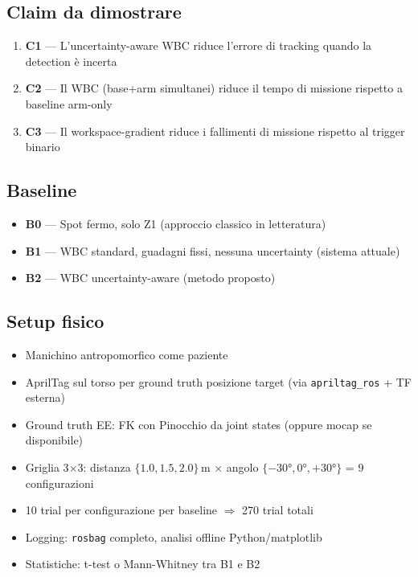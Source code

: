 \documentclass[a4paper,11pt]{article}
\begin{document}
\subsection*{Claim da dimostrare}
\begin{enumerate}
  \item \textbf{C1} --- L'uncertainty-aware WBC riduce l'errore di tracking quando
        la detection è incerta
  \item \textbf{C2} --- Il WBC (base+arm simultanei) riduce il tempo di missione
        rispetto a baseline arm-only
  \item \textbf{C3} --- Il workspace-gradient riduce i fallimenti di missione
        rispetto al trigger binario
\end{enumerate}

\subsection*{Baseline}
\begin{itemize}
  \item \textbf{B0} --- Spot fermo, solo Z1 (approccio classico in letteratura)
  \item \textbf{B1} --- WBC standard, guadagni fissi, nessuna uncertainty
        (sistema attuale)
  \item \textbf{B2} --- WBC uncertainty-aware (metodo proposto)
\end{itemize}

\subsection*{Setup fisico}
\begin{itemize}
  \item Manichino antropomorfico come paziente
  \item AprilTag sul torso per ground truth posizione target
        (via \texttt{apriltag\_ros} + TF esterna)
  \item Ground truth EE: FK con Pinocchio da joint states
        (oppure mocap se disponibile)
  \item Griglia 3$\times$3: distanza $\{1.0, 1.5, 2.0\}$\,m
        $\times$ angolo $\{-30°, 0°, +30°\}$ = 9 configurazioni
  \item 10 trial per configurazione per baseline $\Rightarrow$ 270 trial totali
  \item Logging: \texttt{rosbag} completo, analisi offline Python/matplotlib
  \item Statistiche: t-test o Mann-Whitney tra B1 e B2
\end{itemize}
\end{document}
